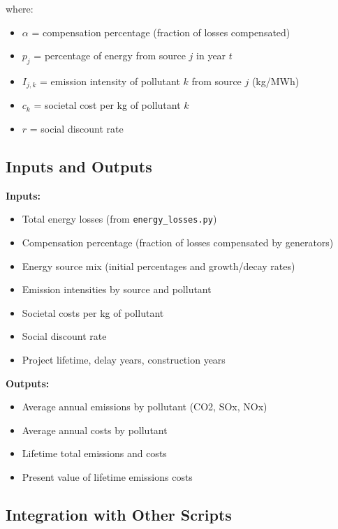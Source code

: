 \documentclass[ctcc_full_documentation.tex]{subfiles}
\begin{document}
where:
\begin{itemize}
    \item $\alpha$ = compensation percentage (fraction of losses compensated)
    \item $p_j$ = percentage of energy from source $j$ in year $t$
    \item $I_{j,k}$ = emission intensity of pollutant $k$ from source $j$ (kg/MWh)
    \item $c_k$ = societal cost per kg of pollutant $k$
    \item $r$ = social discount rate
\end{itemize}

\subsection{Inputs and Outputs}

\textbf{Inputs:}
\begin{itemize}
    \item Total energy losses (from \texttt{energy\_losses.py})
    \item Compensation percentage (fraction of losses compensated by generators)
    \item Energy source mix (initial percentages and growth/decay rates)
    \item Emission intensities by source and pollutant
    \item Societal costs per kg of pollutant
    \item Social discount rate
    \item Project lifetime, delay years, construction years
\end{itemize}

\textbf{Outputs:}
\begin{itemize}
    \item Average annual emissions by pollutant (CO2, SOx, NOx)
    \item Average annual costs by pollutant
    \item Lifetime total emissions and costs
    \item Present value of lifetime emissions costs
\end{itemize}

\subsection{Integration with Other Scripts}
\end{document}
